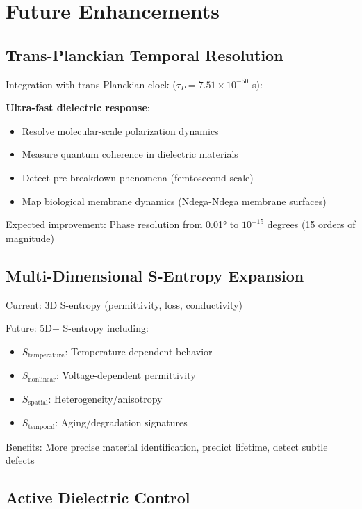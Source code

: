 \documentclass[12pt,a4paper]{article}
\begin{document}
\section{Future Enhancements}

\subsection{Trans-Planckian Temporal Resolution}

Integration with trans-Planckian clock ($\tau_P = 7.51 \times 10^{-50}$ s):

\textbf{Ultra-fast dielectric response}:
\begin{itemize}
\item Resolve molecular-scale polarization dynamics
\item Measure quantum coherence in dielectric materials
\item Detect pre-breakdown phenomena (femtosecond scale)
\item Map biological membrane dynamics (Ndega-Ndega membrane surfaces)
\end{itemize}

Expected improvement: Phase resolution from 0.01° to $10^{-15}$ degrees (15 orders of magnitude)

\subsection{Multi-Dimensional S-Entropy Expansion}

Current: 3D S-entropy (permittivity, loss, conductivity)

Future: 5D+ S-entropy including:
\begin{itemize}
\item $S_{\text{temperature}}$: Temperature-dependent behavior
\item $S_{\text{nonlinear}}$: Voltage-dependent permittivity
\item $S_{\text{spatial}}$: Heterogeneity/anisotropy
\item $S_{\text{temporal}}$: Aging/degradation signatures
\end{itemize}

Benefits: More precise material identification, predict lifetime, detect subtle defects

\subsection{Active Dielectric Control}
\end{document}
